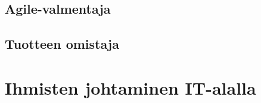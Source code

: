 \documentclass[a4paper]{article}
\begin{document}
\subsection{Agile-valmentaja}

\subsection{Tuotteen omistaja}







\section{Ihmisten johtaminen IT-alalla}



\citep{grosjean2010}
\citep{appelo2012}
\citep{rsaanimate}
\citep{adkins2010}
\citep{augustine2005}
\citep{mcconnell1996}



\end{document}
